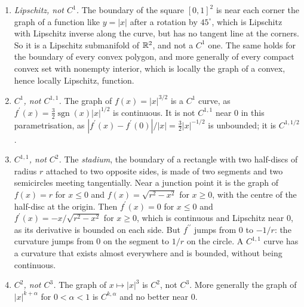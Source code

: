 \begin{example}\label{smooth-manifolds:example-regularity-curves}
\begin{enumerate}
\item \emph{Lipschitz, not $C^1$.} The boundary of the square $[0, 1]^2$ is near each corner the graph of a function like $y = |x|$ after a rotation by $45^\circ$, which is Lipschitz with Lipschitz inverse along the curve,
but has no tangent line at the corners. So it is a Lipschitz submanifold of $\mathbb{R}^2$, and not a $C^1$ one. The same holds for the boundary of every convex polygon, and more generally of every compact convex set with
nonempty interior, which is locally the graph of a convex, hence locally Lipschitz, function.
\item \emph{$C^1$, not $C^{1,1}$.} The graph of $f(x) = |x|^{3/2}$ is a $C^1$ curve, as $f^{\prime}(x) = \frac32\operatorname{sgn}(x)|x|^{1/2}$ is continuous. It is not $C^{1,1}$ near $0$ in this parametrisation, as
$|f^{\prime}(x) - f^{\prime}(0)|/|x| = \frac32|x|^{-1/2}$ is unbounded; it is $C^{1,1/2}$.
\item \emph{$C^{1,1}$, not $C^2$.} The \emph{stadium}, the boundary of a rectangle with two half-discs of radius $r$ attached to two opposite sides, is made of two segments and two semicircles meeting tangentially. Near
a junction point it is the graph of $f(x) = r$ for $x \leq 0$ and $f(x) = \sqrt{r^2 - x^2}$ for $x \geq 0$, with the centre of the half-disc at the origin. Then $f^{\prime}(x) = 0$ for $x \leq 0$ and
$f^{\prime}(x) = -x/\sqrt{r^2 - x^2}$ for $x \geq 0$, which is continuous and Lipschitz near $0$, as its derivative is bounded on each side. But $f^{\prime\prime}$ jumps from $0$ to $-1/r$: the curvature jumps from
$0$ on the segment to $1/r$ on the circle. A $C^{1,1}$ curve has a curvature that exists almost everywhere and is bounded, without being continuous.
\item \emph{$C^2$, not $C^3$.} The graph of $x \mapsto |x|^3$ is $C^2$, not $C^3$. More generally the graph of $|x|^{k+\alpha}$ for $0 < \alpha < 1$ is $C^{k,\alpha}$ and no better near $0$.
\end{enumerate}
\end{example}

